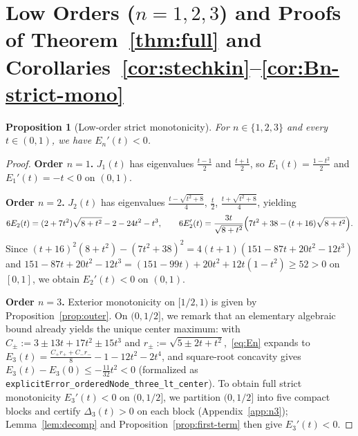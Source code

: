 \documentclass[11pt,a4paper]{article}
\newcommand{\code}[1]{\nolinkurl{#1}}
\newtheorem{proposition}{Proposition}[section]
\theoremstyle{remark}
\numberwithin{equation}{section}
\begin{document}
\section{Low Orders (\texorpdfstring{$n = 1, 2, 3$}{n = 1, 2, 3}) and Proofs of Theorem~\ref{thm:full} and Corollaries~\ref{cor:stechkin}--\ref{cor:Bn-strict-mono}}
\label{sec:finish}

\begin{proposition}[Low-order strict monotonicity]
    \label{prop:low-orders}
    For $n \in \{1, 2, 3\}$ and every $t \in (0,1)$, we have $E_n'(t) < 0$.
\end{proposition}

\begin{proof}
\textbf{Order $n = 1$.} $J_1(t)$ has eigenvalues $\frac{t-1}{2}$ and $\frac{t+1}{2}$, so $E_1(t) = \frac{1 - t^2}{2}$ and $E_1'(t) = -t < 0$ on $(0,1)$.

\smallskip
\noindent\textbf{Order $n = 2$.} $J_2(t)$ has eigenvalues $\frac{t - \sqrt{t^2+8}}{4}$, $\frac{t}{2}$, $\frac{t + \sqrt{t^2+8}}{4}$, yielding
\[
    6E_2(t) = (2 + 7t^2)\sqrt{8 + t^2} - 2 - 24t^2 - t^3,
    \qquad
    6E_2'(t) = \frac{3t}{\sqrt{8 + t^2}}\Bigl(7t^2 + 38 - (t + 16)\sqrt{8 + t^2}\Bigr).
\]
Since $(t + 16)^2(8 + t^2) - (7t^2 + 38)^2 = 4(t + 1)(151 - 87t + 20t^2 - 12t^3)$ and $151 - 87t + 20t^2 - 12t^3 = (151 - 99t) + 20t^2 + 12t(1 - t^2) \ge 52 > 0$ on $[0,1]$, we obtain $E_2'(t) < 0$ on $(0,1)$.

\smallskip
\noindent\textbf{Order $n = 3$.} Exterior monotonicity on $[1/2, 1)$ is given by Proposition~\ref{prop:outer}. On $(0, 1/2]$, we remark that an elementary algebraic bound already yields the unique center maximum: with $C_\pm := 3 \pm 13t + 17t^2 \pm 15t^3$ and $r_\pm := \sqrt{5 \pm 2t + t^2}$,~\eqref{eq:En} expands to $E_3(t) = \frac{C_+ r_+ + C_- r_-}{8} - 1 - 12t^2 - 2t^4$, and square-root concavity gives $E_3(t) - E_3(0) \le -\frac{11}{32}t^2 < 0$ (formalized as \code{explicitError_orderedNode_three_lt_center}). To obtain full strict monotonicity $E_3'(t) < 0$ on $(0, 1/2]$, we partition $(0, 1/2]$ into five compact blocks and certify $\Delta_3(t) > 0$ on each block (Appendix~\ref{app:n3}); Lemma~\ref{lem:decomp} and Proposition~\ref{prop:first-term} then give $E_3'(t) < 0$.
\end{proof}
\end{document}

